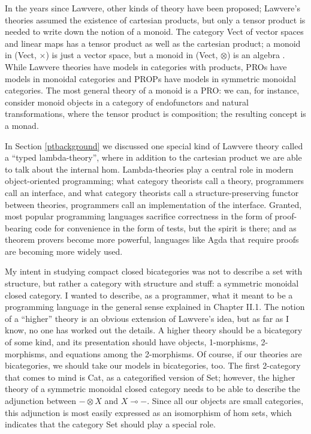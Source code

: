 \documentclass[12pt,twoside,openright]{report}
\newcommand{\lhom}{\multimap}
\begin{document}
In the years since Lawvere, other kinds of theory have been proposed; Lawvere's theories assumed the existence of cartesian products, but only a tensor product is needed to write down the notion of a monoid.  The category Vect of vector spaces and linear maps has a tensor product as well as the cartesian product; a monoid in (Vect, $\times$) is just a vector space, but a monoid in (Vect, $\otimes$) is an algebra \cite{nlabgroupobject}.  While Lawvere theories have models in categories with products, PROs have models in monoidal categories and PROPs have models in symmetric monoidal categories.  The most general theory of a monoid is a PRO: we can, for instance, consider monoid objects in a category of endofunctors and natural transformations, where the tensor product is composition; the resulting concept is a monad.

In Section \ref{ptbackground} we discussed one special kind of Lawvere theory called a ``typed lambda-theory'', where in addition to the cartesian product we are able to talk about the internal hom.  Lambda-theories play a central role in modern object-oriented programming; what category theorists call a theory, programmers call an interface, and what category theorists call a structure-preserving functor between theories, programmers call an implementation of the interface.  Granted, most popular programming languages sacrifice correctness in the form of proof-bearing code for convenience in the form of tests, but the spirit is there; and as theorem provers become more powerful, languages like Agda that require proofs are becoming more widely used.

My intent in studying compact closed bicategories was not to describe a set with structure, but rather a category with structure and stuff: a symmetric monoidal closed category.  I wanted to describe, as a programmer, what it meant to be a programming language in the general sense explained in Chapter II.1.  The notion of a ``higher'' theory is an obvious extension of Lawvere's idea, but as far as I know, no one has worked out the details.  A higher theory should be a bicategory of some kind, and its presentation should have objects, 1-morphisms, 2-morphisms, and equations among the 2-morphisms.  Of course, if our theories are bicategories, we should take our models in bicategories, too.  The first 2-category that comes to mind is Cat, as a categorified version of Set; however, the higher theory of a symmetric monoidal closed category needs to be able to describe the adjunction between $- \otimes X$ and $X \lhom -$.  Since all our objects are small categories, this adjunction is most easily expressed as an isomorphism of hom sets, which indicates that the category Set should play a special role.
\end{document}

